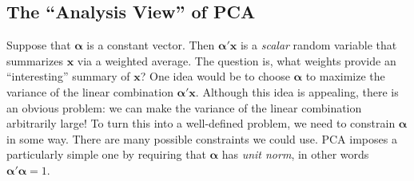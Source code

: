 \documentclass[12pt]{article}
\theoremstyle{definition}
\begin{document}
\subsection{The ``Analysis View'' of PCA}
Suppose that $\boldsymbol{\alpha}$ is a constant vector. Then $\boldsymbol{\alpha}'\mathbf{x}$ is a \emph{scalar} random variable that summarizes $\mathbf{x}$ via a weighted average. The question is, what weights provide an ``interesting'' summary of $\mathbf{x}$? One idea would be to choose $\boldsymbol{\alpha}$ to maximize the variance of the linear combination $\boldsymbol{\alpha}'\mathbf{x}$. Although this idea is appealing, there is an obvious problem: we can make the variance of the linear combination arbitrarily large! To turn this into a well-defined problem, we need to constrain $\boldsymbol{\alpha}$ in some way. There are many possible constraints we could use. PCA imposes a particularly simple one by requiring that $\boldsymbol{\alpha}$ has \emph{unit norm}, in other words $\boldsymbol{\alpha}'\boldsymbol{\alpha} = 1$. 
\end{document}
